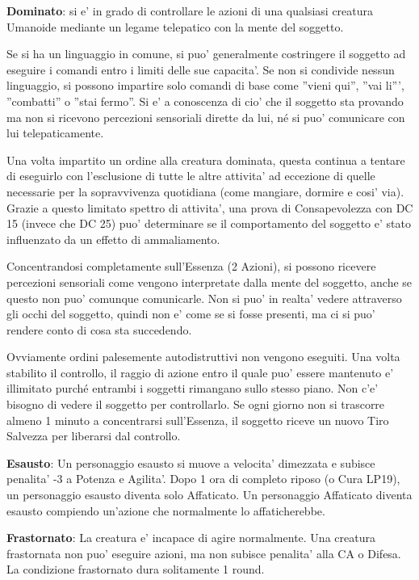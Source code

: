 \documentclass[a4paper,11pt,twoside,openany]{book}
\begin{document}
{		\textbf{Dominato}: si e' in grado di controllare le azioni di una qualsiasi creatura Umanoide mediante un legame telepatico con la mente del soggetto.
		
		Se si ha un linguaggio in comune, si puo' generalmente costringere il soggetto ad eseguire i comandi entro i limiti delle sue capacita'. Se non si condivide nessun linguaggio, si possono impartire solo comandi di base come ''vieni qui'', ''vai li''', ''combatti'' o ''stai fermo''. Si e' a conoscenza di cio' che il soggetto sta provando ma non si ricevono percezioni sensoriali dirette da lui, né si puo' comunicare con lui telepaticamente.
		
		Una volta impartito un ordine alla creatura dominata, questa continua a tentare di eseguirlo con l'esclusione di tutte le altre attivita' ad eccezione di quelle necessarie per la sopravvivenza quotidiana (come mangiare, dormire e cosi' via). Grazie a questo limitato spettro di attivita', una prova di Consapevolezza con DC 15 (invece che DC 25) puo' determinare se il comportamento del soggetto e' stato influenzato da un effetto di ammaliamento.
		
		Concentrandosi completamente sull'Essenza (2 Azioni), si possono ricevere percezioni sensoriali come vengono interpretate dalla mente del soggetto, anche se questo non puo' comunque comunicarle. Non si puo' in realta' vedere attraverso gli occhi del soggetto, quindi non e' come se si fosse presenti, ma ci si puo' rendere conto di cosa sta succedendo. 
		
		Ovviamente ordini palesemente autodistruttivi non vengono eseguiti. Una volta stabilito il controllo, il raggio di azione entro il quale puo' essere mantenuto e' illimitato purché entrambi i soggetti rimangano sullo stesso piano. Non c'e' bisogno di vedere il soggetto per controllarlo. Se ogni giorno non si trascorre almeno 1 minuto a concentrarsi sull'Essenza, il soggetto riceve un nuovo Tiro Salvezza per liberarsi dal controllo.
		
		\textbf{Esausto}: Un personaggio esausto si muove a velocita' dimezzata e subisce penalita' -3 a Potenza e Agilita'. Dopo 1 ora di completo riposo (o Cura LP19), un personaggio esausto diventa solo Affaticato. Un personaggio Affaticato diventa esausto compiendo un'azione che normalmente lo affaticherebbe.
		
		\textbf{Frastornato}: La creatura e' incapace di agire normalmente.
		Una creatura frastornata non puo' eseguire azioni, ma non subisce penalita' alla CA o Difesa. La condizione frastornato dura solitamente 1 round.
		
}
\end{document}
